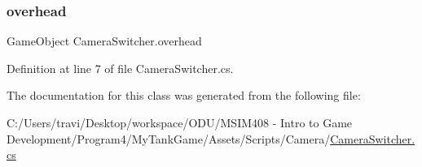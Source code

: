\subsubsection{\texorpdfstring{overhead}{overhead}}
{\footnotesize\ttfamily Game\+Object Camera\+Switcher.\+overhead}



Definition at line 7 of file Camera\+Switcher.\+cs.



The documentation for this class was generated from the following file\+:\begin{DoxyCompactItemize}
\item 
C\+:/\+Users/travi/\+Desktop/workspace/\+O\+D\+U/\+M\+S\+I\+M408 -\/ Intro to Game Development/\+Program4/\+My\+Tank\+Game/\+Assets/\+Scripts/\+Camera/\hyperlink{_camera_switcher_8cs}{Camera\+Switcher.\+cs}\end{DoxyCompactItemize}

